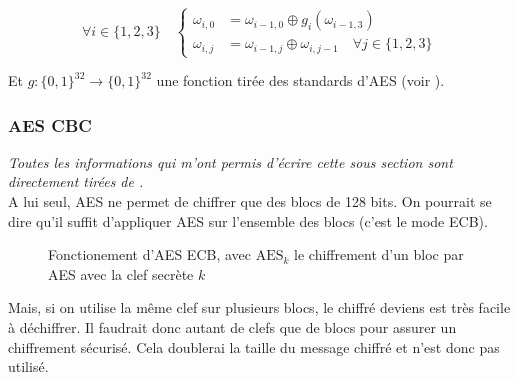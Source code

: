 \documentclass[a4paper, 12pt]{article}
\begin{document}
$$
\forall i \in \{1,2,3\} \quad 
\begin{cases}
	\omega_{i,0} &= \omega_{i-1,0} \oplus g_i(\omega_{i-1,3}) \\
	\omega_{i,j} &= \omega_{i-1,j} \oplus \omega_{i,j-1} \quad \forall j \in \{1,2,3\} 
\end{cases}
$$

\noindent Et $g: \{0,1\}^{32} \rightarrow \{0,1\}^{32}$ une fonction tirée des standards d'AES (voir \cite{aesnist}).
\color{red}

\subsubsection{AES CBC}\label{sectioncbc}
\noindent\emph{Toutes les informations qui m'ont permis d'écrire cette sous section sont directement tirées de \cite{courscourt}.}\\

A lui seul, AES ne permet de chiffrer que des blocs de 128 bits. On pourrait se dire qu'il suffit d'appliquer AES sur l'ensemble des blocs (c'est le mode ECB). 

\begin{figure}[h]
\centering
{}
\caption{Fonctionement d'AES ECB, avec $\text{AES}_k$ le chiffrement d'un bloc par AES avec la clef secrète $k$}
\label{ilu_ECB}
\end{figure}

Mais, si on utilise la même clef sur plusieurs blocs, le chiffré deviens est très facile à déchiffrer. Il faudrait donc autant de clefs que de blocs pour assurer un chiffrement sécurisé. Cela doublerai la taille du message chiffré et n'est donc pas utilisé. \\
\end{document}
